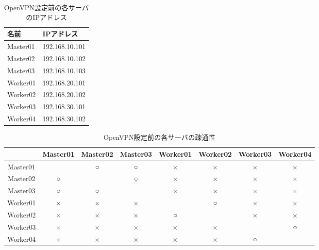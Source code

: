 \begin{table}[htb]
  \begin{center}
    \caption{OpenVPN設定前の各サーバのIPアドレス}
    \begin{tabular}{|l|l|} \hline
      名前 & IPアドレス \\ \hline
      Master01 & 192.168.10.101 \\ \hline
      Master02 & 192.168.10.102 \\ \hline
      Master03 & 192.168.10.103 \\ \hline
      Worker01 & 192.168.20.101 \\ \hline
      Worker02 & 192.168.20.102 \\ \hline
      Worker03 & 192.168.30.101 \\ \hline
      Worker04 & 192.168.30.102 \\ \hline
    \end{tabular}
  \end{center}
\end{table}

\begin{table}[htb]
  \begin{center}
    \caption{OpenVPN設定前の各サーバの疎通性}
    \begin{tabular}{|c|c|c|c|c|c|c|c|} \hline
      & Master01 & Master02 & Master03 & Worker01 & Worker02 & Worker03 & Worker04 \\ \hline
      Master01 & \ & ○ & ○ & × & × & × & × \\ \hline
      Master02 & ○ & \ & ○ & × & × & × & × \\ \hline
      Master03 & ○ & ○ & \ & × & × & × & × \\ \hline
      Worker01 & × & × & × & \ & ○ & × & × \\ \hline
      Worker02 & × & × & × & ○ & \ & × & × \\ \hline
      Worker03 & × & × & × & × & × & \ & ○ \\ \hline
      Worker04 & × & × & × & × & × & ○ & \ \\ \hline
    \end{tabular}
  \end{center}
\end{table}

